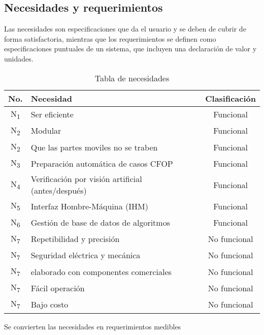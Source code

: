 \subsection{Necesidades y requerimientos}

Las necesidades son especificaciones que da el usuario y se deben de cubrir de forma satisfactoria, mientras
que los requerimientos se definen como especificaciones puntuales de un sistema, que incluyen una
declaración de valor y unidades.\\

\begin{table}[h]
	\centering
	\caption{Tabla de necesidades}
	\begin{tabular}{clc}
		\toprule
		\textbf{No.} & \textbf{Necesidad} & \textbf{Clasificación} \\ \midrule
		N\textsubscript{1} &   Ser eficiente    &       Funcional        \\
        N\textsubscript{2} &   Modular          &       Funcional        \\
        N\textsubscript{2} &   Que las partes moviles no se traben          &       Funcional        \\
		N\textsubscript{3} &   Preparación automática de casos CFOP    &       Funcional        \\
        N\textsubscript{4} &   Verificación por visión artificial (antes/después)    &       Funcional        \\
        N\textsubscript{5} &   Interfaz Hombre-Máquina (IHM)    &       Funcional        \\
		N\textsubscript{6} &   Gestión de base de datos de algoritmos       &      Funcional      \\
        N\textsubscript{7} &   Repetibilidad y precisión    &      No funcional      \\
        N\textsubscript{7} &   Seguridad eléctrica y mecánica    &      No funcional      \\
        N\textsubscript{7} &   elaborado con componentes comerciales    &      No funcional      \\
        N\textsubscript{7} &   Fácil operación    &      No funcional      \\
        N\textsubscript{7} &   Bajo costo    &      No funcional      \\ \bottomrule
	\end{tabular}
\end{table}

\FloatBarrier
Se convierten las necesidades en requerimientos medibles

